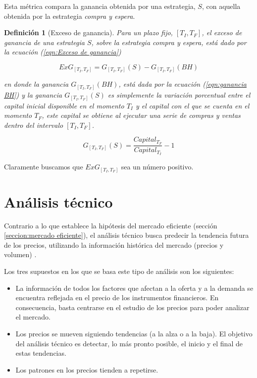 \documentclass[12pt]{report}
\theoremstyle{break}
\newtheorem{definicion}{Definición}[chapter]
\theoremstyle{break}
\begin{document}
Esta métrica compara la ganancia obtenida por una estrategia, $S$, con aquella obtenida por la estrategia \textit{compra y espera}.

\begin{definicion}[Exceso de ganancia]
\label{definicion:exceso de ganancia}
Para un plazo fijo, $\left[T_{I}, T_{F}\right]$, el exceso de ganancia de una estrategia $S$, sobre la estrategia \textit{compra y espera}, está dado por la ecuación (\ref{eqn:Exceso de ganancia})

\begin{equation} \label{eqn:Exceso de ganancia}
ExG_{\left[T_{I}, T_{F}\right]} = G_{\left[T_{I}, T_{F}\right]} (S) - G_{\left[T_{I}, T_{F}\right]} (BH)
\end{equation}

en donde la ganancia $G_{\left[T_{I}, T_{F}\right]} (BH)$, está dada por la ecuación (\ref{eqn:ganancia BH}) y la ganancia $G_{\left[T_{I}, T_{F}\right]} (S)$ es simplemente la variación porcentual entre el capital inicial disponible en el momento $T_{I}$ y el capital con el que se cuenta en el momento $T_{F}$, este capital se obtiene al ejecutar una serie de compras y ventas dentro del intervalo $\left[T_{I}, T_{F}\right]$.

\begin{equation} \label{eqn:Ganancia estrategia S}
G_{\left[T_{I}, T_{F}\right]}(S) = \dfrac{Capital_{T_F}}{Capital_{T_I} } - 1 
\end{equation}
\end{definicion}
Claramente buscamos que $ExG_{\left[T_{I}, T_{F}\right]}$ sea un número positivo.

\section{Análisis técnico}
\label{seccion:analisisTecnico}
Contrario a lo que establece la hipótesis del mercado eficiente (sección \ref{seccion:mercado eficiente}), el análisis técnico busca predecir la tendencia futura de los precios, utilizando la información histórica del mercado (precios y volumen) \cite{murphy1999technical}.

Los tres supuestos en los que se basa este tipo de análisis son los siguientes:

\begin{itemize}
\item La información de todos los factores que afectan a la oferta y a la demanda se encuentra reflejada en el precio de los instrumentos financieros. En consecuencia, basta centrarse en el estudio de los precios para poder analizar el mercado.

\item Los precios se mueven siguiendo tendencias (a la alza o a la baja). El objetivo del análisis técnico es detectar, lo más pronto posible, el inicio y el final de estas tendencias.

\item Los patrones en los precios tienden a repetirse.
\end{itemize}
\end{document}
